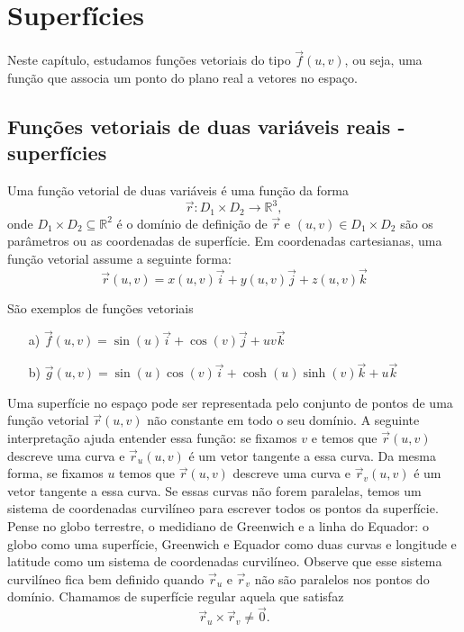 

\chapter{Superfícies}
  Neste capítulo, estudamos funções vetoriais do tipo $\vec{f}(u,v)$, ou seja, uma função que associa um ponto do plano real a vetores no espaço. 
\section{Funções vetoriais de duas variáveis reais - superfícies}
Uma função vetorial de duas variáveis é uma função da forma $$\vec{r}:D_1\times D_2 \to \mathbb{R}^3,$$ onde $D_1\times D_2\subseteq \mathbb{R}^2$ é o domínio de definição de $\vec{r}$ e $(u,v)\in D_1\times D_2$ são os parâmetros ou as coordenadas de superfície. Em coordenadas cartesianas, uma função vetorial assume a seguinte forma:
$$\vec{r}(u,v)=x(u,v)\vec{i}+y(u,v)\vec{j}+z(u,v)\vec{k}$$
\begin{ex}\label{exfv1} São exemplos de funções vetoriais
\begin{itemize}
\item [a)] $\vec{f}(u,v)=\sin(u)\vec{i}+\cos(v)\vec{j}+uv\vec{k}$
\item [b)] $\vec{g}(u,v)=\sin(u)\cos(v) \vec{i}+\cosh(u)\sinh(v)\vec{k}+u\vec{k}$
\end{itemize}
\end{ex} 

Uma superfície no espaço pode ser representada pelo conjunto de pontos de uma função vetorial $\vec{r}(u,v)$ não constante em todo o seu domínio. A seguinte interpretação ajuda entender essa função: se fixamos $v$ e temos que $\vec{r}(u,v)$ descreve uma curva e $\vec{r}_u(u,v)$ é um vetor tangente a essa curva. Da mesma forma, se fixamos $u$ temos que $\vec{r}(u,v)$ descreve uma curva e $\vec{r}_v(u,v)$ é um vetor tangente a essa curva. Se essas curvas não forem paralelas, temos um sistema de coordenadas curvilíneo para escrever todos os pontos da superfície. Pense no globo terrestre, o medidiano de Greenwich e a linha do Equador: o globo como uma superfície, Greenwich e Equador como duas curvas e longitude e latitude como um sistema de coordenadas curvilíneo. Observe que esse sistema curvilíneo fica bem definido quando $\vec{r}_u$ e $\vec{r}_v$ não são paralelos nos pontos do domínio. Chamamos de superfície regular aquela que satisfaz
$$
\vec{r}_u\times \vec{r}_v\neq \vec{0}.
$$

